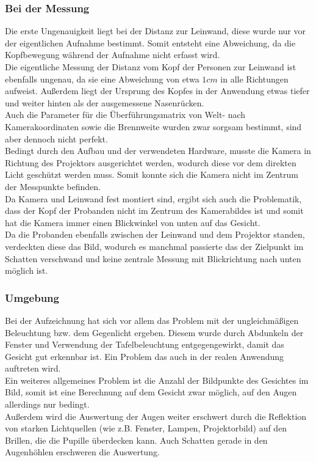 \subsubsection{Bei der Messung}
Die erste Ungenauigkeit liegt bei der Distanz zur Leinwand, diese wurde nur vor der eigentlichen Aufnahme bestimmt. Somit entsteht eine Abweichung, da die Kopfbewegung während der Aufnahme nicht erfasst wird.\\
Die eigentliche Messung der Distanz  vom Kopf der Personen zur Leinwand ist ebenfalls ungenau, da sie eine Abweichung von etwa $1cm$ in alle Richtungen aufweist. Außerdem liegt der Ursprung des Kopfes in der Anwendung etwas tiefer und weiter hinten als der ausgemessene Nasenrücken.\\
Auch die Parameter für die Überführungsmatrix von Welt- nach Kamerakoordinaten sowie die Brennweite wurden zwar sorgsam bestimmt, sind aber dennoch nicht perfekt.\\
Bedingt durch den Aufbau und der verwendeten Hardware, musste die Kamera in Richtung des Projektors ausgerichtet werden, wodurch diese vor dem direkten Licht geschützt werden muss. Somit konnte sich die Kamera nicht im Zentrum der Messpunkte befinden.\\
Da Kamera und Leinwand fest montiert sind, ergibt sich auch die Problematik, dass der Kopf der Probanden nicht im Zentrum des Kamerabildes ist und somit hat die Kamera immer einen Blickwinkel von unten auf das Gesicht.\\
Da die Probanden ebenfalls zwischen der Leinwand und dem Projektor standen, verdeckten diese das Bild, wodurch es manchmal passierte das der Zielpunkt im Schatten verschwand und keine zentrale Messung mit Blickrichtung nach unten möglich ist.
\subsubsection{Umgebung}
Bei der Aufzeichnung hat sich vor allem das Problem mit der ungleichmäßigen Beleuchtung bzw. dem Gegenlicht ergeben. Diesem wurde durch Abdunkeln der Fenster und Verwendung der Tafelbeleuchtung entgegengewirkt, damit das Gesicht gut erkennbar ist. Ein Problem das auch in der realen Anwendung auftreten wird.\\
Ein weiteres allgemeines Problem ist die Anzahl der Bildpunkte des Gesichtes im Bild, somit ist eine Berechnung auf dem Gesicht zwar möglich, auf den Augen allerdings nur bedingt.\\
Außerdem wird die Auswertung der Augen weiter erschwert durch die Reflektion von starken Lichtquellen (wie z.B. Fenster, Lampen, Projektorbild) auf den Brillen, die die Pupille überdecken kann. Auch Schatten gerade in den Augenhöhlen erschweren die Auswertung.